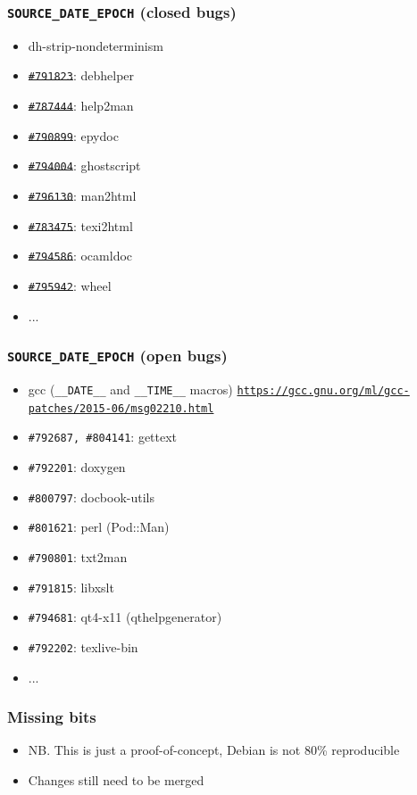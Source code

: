 \documentclass[14pt,aspectratio=169]{beamer}
\begin{document}
\begin{frame}
 \frametitle{\texttt{SOURCE\_DATE\_EPOCH} (closed bugs)}

 \begin{itemize}
  \item dh-strip-nondeterminism
  \item \sout{\texttt{\#791823}}: debhelper
  \item \sout{\texttt{\#787444}}: help2man
  \item \sout{\texttt{\#790899}}: epydoc
  \item \sout{\texttt{\#794004}}: ghostscript
  \item \sout{\texttt{\#796130}}: man2html
  \item \sout{\texttt{\#783475}}: texi2html
  \item \sout{\texttt{\#794586}}: ocamldoc
  \item \sout{\texttt{\#795942}}: wheel
  \item ...
 \end{itemize}

\end{frame}

\begin{frame}
 \frametitle{\texttt{SOURCE\_DATE\_EPOCH} (open bugs)}

 \begin{itemize}
  \item gcc (\texttt{\_\_DATE\_\_} and \texttt{\_\_TIME\_\_} macros) \texttt{\footnotesize{\url{https://gcc.gnu.org/ml/gcc-patches/2015-06/msg02210.html}}}
  \item \texttt{\#792687, \#804141}: gettext
  \item \texttt{\#792201}: doxygen
  \item \texttt{\#800797}: docbook-utils
  \item \texttt{\#801621}: perl (Pod::Man)
  \item \texttt{\#790801}: txt2man
  \item \texttt{\#791815}: libxslt
  \item \texttt{\#794681}: qt4-x11 (qthelpgenerator)
  \item \texttt{\#792202}: texlive-bin
  \item ...
 \end{itemize}

\end{frame}


\begin{frame}
 \frametitle{Missing bits}
 \begin{itemize}
  \item NB. This is just a proof-of-concept, Debian is not 80\%
  reproducible
  \item Changes still need to be merged
 \end{itemize}
\end{frame}
\end{document}
